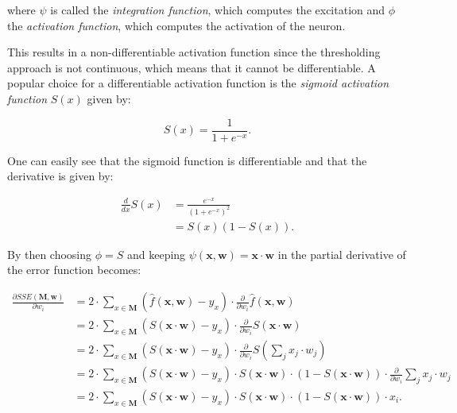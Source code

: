 where $\psi$ is called the \textit{integration function}, which computes the excitation and $\phi$ the \textit{activation function}, which computes the activation of the neuron.

This results in a non-differentiable activation function since the thresholding approach is not continuous, which means that it cannot be differentiable.
A popular choice for a differentiable activation function is the \textit{sigmoid activation function} $S(x)$ given by:

\begin{equation}
    S(x) = \frac{1}{1 + e^{-x}}.
\end{equation}

One can easily see that the sigmoid function is differentiable and that the derivative is given by:

\begin{equation}
    \begin{split}
        \frac{d}{dx} S(x)
        &= \frac{e^{-x}}{(1 + e^{-x})^2} \\
        &= S(x)(1 - S(x)).
    \end{split}
\end{equation}

By then choosing $\phi = S$ and keeping $\psi(\bm{x}, \bm{w}) = \bm{x} \cdot \bm{w}$ in  the partial derivative of the error function becomes:

\begin{equation}
    \label{eq:error-derivative-2}
    \begin{split}
        \frac{\partial SSE(\bm{M}, \bm{w})}{\partial w_i}
        &= 2 \cdot \sum_{x \in \bm{M}} (\hat{f}(\bm{x},\bm{w}) - y_x) \cdot  \frac{\partial }{\partial w_i} \hat{f}(\bm{x}, \bm{w}) \\
        &= 2 \cdot \sum_{x \in \bm{M}} (S(\bm{x} \cdot \bm{w}) - y_x) \cdot  \frac{\partial }{\partial w_i} S(\bm{x} \cdot \bm{w}) \\
        &= 2 \cdot \sum_{x \in \bm{M}} (S(\bm{x} \cdot \bm{w}) - y_x) \cdot  \frac{\partial }{\partial w_i} S \left(\sum_j x_j \cdot w_j \right) \\
        &= 2 \cdot \sum_{x \in \bm{M}} (S(\bm{x} \cdot \bm{w}) - y_x) \cdot  S(\bm{x} \cdot \bm{w}) \cdot (1-S(\bm{x} \cdot \bm{w})) \cdot \frac{\partial }{\partial w_i} \sum_j x_j \cdot w_j \\
        &= 2 \cdot \sum_{x \in \bm{M}} (S(\bm{x} \cdot \bm{w}) - y_x) \cdot  S(\bm{x} \cdot \bm{w}) \cdot (1-S(\bm{x} \cdot \bm{w}))\cdot x_i.
    \end{split}
\end{equation}

